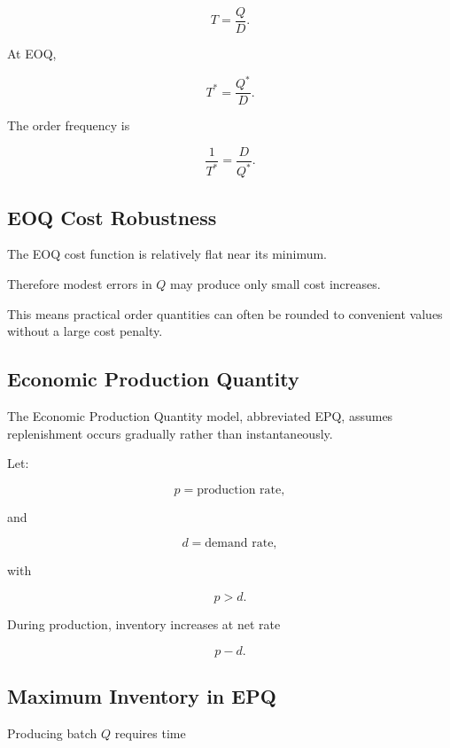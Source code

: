 \[
\boxed{
T
=
\frac{Q}{D}.
}
\]

At EOQ,

\[
\boxed{
T^*
=
\frac{Q^*}{D}.
}
\]

The order frequency is

\[
\boxed{
\frac{1}{T^*}
=
\frac{D}{Q^*}.
}
\]

\subsection{EOQ Cost Robustness}
\label{subsec:eoq-cost-robustness}

The EOQ cost function is relatively flat near its minimum.

Therefore modest errors in \(Q\) may produce only small cost increases.

This means practical order quantities can often be rounded to convenient
values without a large cost penalty.

\subsection{Economic Production Quantity}
\label{subsec:economic-production-quantity}

The Economic Production Quantity model, abbreviated EPQ, assumes
replenishment occurs gradually rather than instantaneously.

Let:

\[
p
=
\text{production rate},
\]

and

\[
d
=
\text{demand rate},
\]

with

\[
\boxed{
p>d.
}
\]

During production, inventory increases at net rate

\[
\boxed{
p-d.
}
\]

\subsection{Maximum Inventory in EPQ}
\label{subsec:epq-maximum-inventory}

Producing batch \(Q\) requires time

